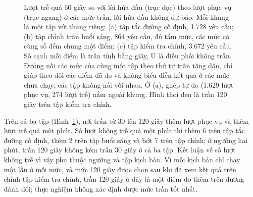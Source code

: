 \begin{figure}[htbp]
\caption{Lượt trễ quá 60 giây so với lời hứa đầu (trục dọc) theo lượt phục vụ (trục ngang) ở các mức
trần, lời hứa đầu không dự báo. Mỗi khung là một tập với thang riêng: (a) tập tắc đường cố định, 1.728
yêu cầu; (b) tập chỉnh trần buổi sáng, 864 yêu cầu, đủ tám mức, các mức có cùng số đếm chung một điểm; (c) tập
kiểm tra chính, 3.672 yêu cầu. Số cạnh mỗi điểm là trần tính bằng giây, U là điều phối không trần. Đường nối các mức
của cùng một tập theo thứ tự trần tăng dần, chỉ giúp theo dõi các điểm đã đo và không biểu diễn kết quả ở các mức
chưa chạy; các tập không nối với nhau. Ở (a), ghép tự do (1.629 lượt phục vụ, 274 lượt trễ) nằm ngoài khung. Hình
thoi đen là trần 120 giây trên tập kiểm tra chính.}
\label{hinh:c4-tran}
\end{figure}

Trên cả ba tập (Hình~\ref{hinh:c4-tran}), nới trần từ 30 lên 120 giây thêm lượt phục vụ và thêm lượt trễ quá một
phút. Số lượt không trễ quá một phút thì thêm 6 trên tập tắc đường cố định, thêm 2 trên tập buổi sáng và bớt 7 trên
tập chính; ở ngưỡng hai phút, trần 120 giây không kém trần 30 giây ở cả ba tập. Kết luận về số lượt không trễ vì vậy
phụ thuộc ngưỡng và tập kịch bản. Vì mỗi kịch bản chỉ chạy một lần ở mỗi mức, và mức 120 giây được chọn sau khi đã xem
kết quả trên chính tập kiểm tra chính, trần 120 giây ở đây là một điểm đo thêm trên đường đánh đổi; thực nghiệm không
xác định được mức trần tốt nhất.

